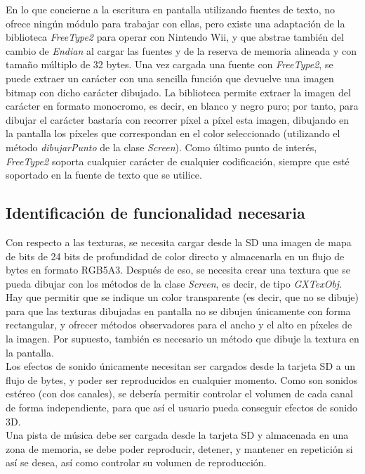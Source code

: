 En lo que concierne a la escritura en pantalla utilizando fuentes de texto,  no ofrece ningún módulo para trabajar con ellas, pero existe una adaptación de la biblioteca \emph{FreeType2} para operar con Nintendo Wii, y que abstrae también del cambio de \emph{Endian} al cargar las fuentes y de la reserva de memoria alineada y con tamaño múltiplo de 32 bytes. Una vez cargada una fuente con \emph{FreeType2}, se puede extraer un carácter con una sencilla función que devuelve una imagen bitmap con dicho carácter dibujado. La biblioteca permite extraer la imagen del carácter en formato monocromo, es decir, en blanco y negro puro; por tanto, para dibujar el carácter bastaría con recorrer píxel a píxel esta imagen, dibujando en la pantalla los píxeles que correspondan en el color seleccionado (utilizando el método \emph{dibujarPunto} de la clase \emph{Screen}). Como último punto de interés, \emph{FreeType2} soporta cualquier carácter de cualquier codificación, siempre que esté soportado en la fuente de texto que se utilice.

\subsection{Identificación de funcionalidad necesaria}

Con respecto a las texturas, se necesita cargar desde la SD una imagen de mapa de bits de 24 bits de profundidad de color directo y almacenarla en un flujo de bytes en formato RGB5A3. Después de eso, se necesita crear una textura que se pueda dibujar con los métodos de la clase \emph{Screen}, es decir, de tipo \emph{GXTexObj}. Hay que permitir que se indique un color transparente (es decir, que no se dibuje) para que las texturas dibujadas en pantalla no se dibujen únicamente con forma rectangular, y ofrecer métodos observadores para el ancho y el alto en píxeles de la imagen. Por supuesto, también es necesario un método que dibuje la textura en la pantalla.\\

Los efectos de sonido únicamente necesitan ser cargados desde la tarjeta SD a un flujo de bytes, y poder ser reproducidos en cualquier momento. Como son sonidos estéreo (con dos canales), se debería permitir controlar el volumen de cada canal de forma independiente, para que así el usuario pueda conseguir efectos de sonido 3D.\\

Una pista de música debe ser cargada desde la tarjeta SD y almacenada en una zona de memoria, se debe poder reproducir, detener, y mantener en repetición si así se desea, así como controlar su volumen de reproducción.\\

